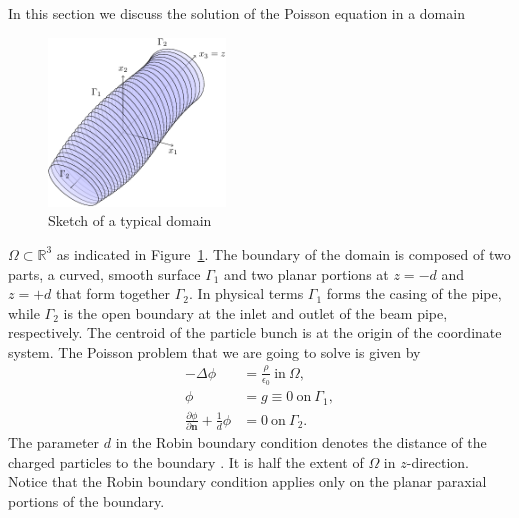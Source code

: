 \documentclass[a4paper,10pt,3p,final,pdftex]{elsarticle}
\renewcommand{\Re}{\mathbb{R}}
\begin{document}
In this section we discuss the solution of the Poisson equation in a
domain 
\begin{figure}[htb]
  \centering
  \includegraphics[width=0.42\textwidth]{figbound.pdf}
  \caption{Sketch of a typical domain}
  \label{fig:domain}
\end{figure}
$\Omega \subset \Re^3$ as indicated in Figure~\ref{fig:domain}.  The
boundary of the domain is composed of two parts, a curved, smooth
surface $\Gamma_1$ and two planar portions at $z=-d$ and $z=+d$ that
form together $\Gamma_2$.  In physical terms $\Gamma_1$ forms the casing
of the pipe, while $\Gamma_2$ is the open boundary at the inlet and
outlet of the beam pipe, respectively.  The centroid of the particle bunch is at the
origin of the coordinate system.  The Poisson problem that we are going
to solve is given by
\begin{equation} \label{eq:poisson}
  \begin{aligned}
    -\Delta \phi &= \frac{\rho}{\epsilon_0}\ \text{in}\ \Omega, \\
    \phi &= g \equiv 0\ \text{on}\ \Gamma_1,   \\
    \frac{\partial \phi}{\partial \mathbf{n}} + \frac {1}{d} \phi &= 0\
    \text{on}\ \Gamma_2.
  \end{aligned}
\end{equation}
The parameter $d$ in the Robin boundary condition denotes the distance
of the charged particles to the boundary
\cite{poplau_self-adaptive_2008}.  It is half the extent of $\Omega$ in
$z$-direction.  Notice that the Robin boundary condition applies only on
the planar paraxial portions of the boundary.
\end{document}
